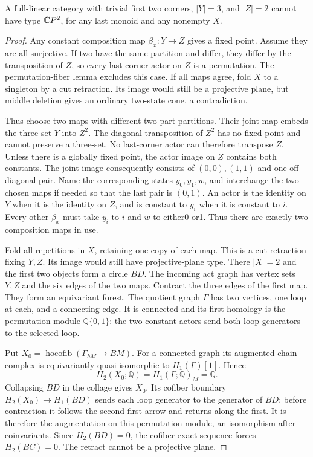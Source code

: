 \begin{proposition}
\label{CP2:A-three-two-incoming}
A full-linear category with trivial first two corners,
$|Y|=3$, and $|Z|=2$ cannot have type $\mathbb{C}P^2$,
for any last monoid and any nonempty $X$.
\end{proposition}
\begin{proof}
Any constant composition map $\beta_x:Y\to Z$ gives
a fixed point. Assume they are all surjective. If two
have the same partition and differ, they differ by
the transposition of $Z$, so every last-corner actor
on $Z$ is a permutation. The permutation-fiber lemma
excludes this case. If all maps agree, fold $X$ to
a singleton by a cut retraction. Its image would
still be a projective plane, but middle deletion
gives an ordinary two-state cone, a contradiction.

Thus choose two maps with different two-part
partitions. Their joint map embeds the three-set
$Y$ into $Z^2$. The diagonal transposition of $Z^2$
has no fixed point and cannot preserve a three-set.
No last-corner actor can therefore transpose $Z$.
Unless there is a globally fixed point, the actor
image on $Z$ contains both constants. The joint
image consequently consists of $(0,0),(1,1)$ and
one off-diagonal pair. Name the corresponding states
$y_0,y_1,w$, and interchange the two chosen maps
if needed so that the last pair is $(0,1)$.
An actor is the identity on $Y$ when it is the
identity on $Z$, and is constant to $y_i$ when
it is constant to $i$. Every other $\beta_x$ must
take $y_i$ to $i$ and $w$ to either0 or1. Thus
there are exactly two composition maps in use.

Fold all repetitions in $X$, retaining one copy of
each map. This is a cut retraction fixing $Y,Z$.
Its image would still have projective-plane type.
There $|X|=2$ and the first two objects form a
circle $BD$. The incoming act graph has vertex
sets $Y,Z$ and the six edges of the two maps.
Contract the three edges of the first map. They
form an equivariant forest. The quotient graph
$\Gamma$ has two vertices, one loop at each,
and a connecting edge. It is connected and its
first homology is the permutation module
$\mathbb Q\{0,1\}$: the two constant actors send
both loop generators to the selected loop.

Put $X_0=\operatorname{hocofib}(\Gamma_{hM}\to BM)$.
For a connected graph its augmented chain complex
is equivariantly quasi-isomorphic to $H_1(\Gamma)[1]$.
Hence
\[
 H_2(X_0;\mathbb Q)=H_1(\Gamma;\mathbb Q)_M=\mathbb Q.
\]
Collapsing $BD$ in the collage gives $X_0$.
Its cofiber boundary $H_2(X_0)\to H_1(BD)$ sends
each loop generator to the generator of $BD$:
before contraction it follows the second first-arrow
and returns along the first. It is therefore the
augmentation on this permutation module, an
isomorphism after coinvariants. Since $H_2(BD)=0$,
the cofiber exact sequence forces $H_2(BC)=0$.
The retract cannot be a projective plane.
\end{proof}

